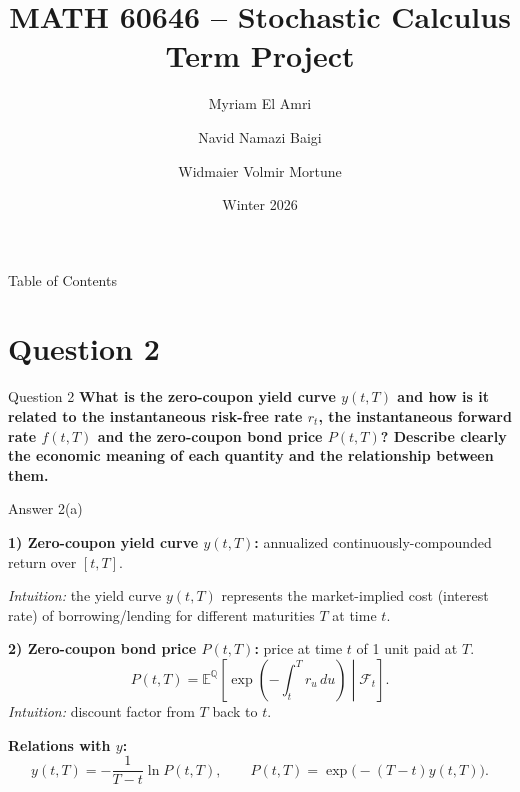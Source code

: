 \documentclass[compress]{beamer}
\title{MATH 60646 -- Stochastic Calculus \\ Term Project}
\author{Myriam El Amri \and Navid Namazi Baigi \and Widmaier Volmir Mortune}
\institute{HEC Montreal}
\date{Winter 2026}
\begin{document}
%

\begin{frame}
    \titlepage
\end{frame}

\begin{frame}{Table of Contents}
    \tableofcontents
\end{frame}


\section{Question 2}

\begin{frame}{Question 2}
    \textbf{What is the zero-coupon yield curve $y(t,T)$ and how is it related to the instantaneous risk-free rate $r_t$, the instantaneous forward rate $f(t,T)$ and the zero-coupon bond price $P(t,T)$? Describe clearly the economic meaning of each quantity and the relationship between them.}
\end{frame}

\begin{frame}{Answer 2(a)}
    {\small

	\vspace{1em}
    
	\textbf{1) Zero-coupon yield curve $y(t,T)$:} annualized continuously-compounded return over $[t,T]$.
	
	\vspace{1em}

    \textit{Intuition:} the yield curve $y(t,T)$ represents the market-implied cost (interest rate) of borrowing/lending for different maturities $T$ at time $t$.
    
	\vspace{1em}

    \textbf{2) Zero-coupon bond price $P(t,T)$:} price at time $t$ of 1 unit paid at $T$.
    \[
        P(t,T)=\mathbb{E}^{\mathbb{Q}}\!\left[\exp\!\left(-\int_t^T r_u\,du\right)\middle|\mathcal F_t\right].
    \]
    \textit{Intuition:} discount factor from $T$ back to $t$.

    \textbf{Relations with $y$:}
    \[
        y(t,T)= -\frac{1}{T-t}\ln P(t,T),
        \qquad
        P(t,T)=\exp\!\big(-(T-t)y(t,T)\big).
    \]

    \vspace{0.4em}}
\end{frame}
\end{document}
